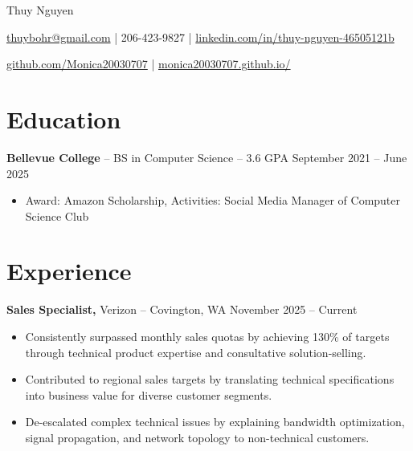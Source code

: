 \documentclass[11pt]{article}       %
\begin{document}
\centerline{\Huge Thuy Nguyen}

\vspace{5pt}

\centerline{\href{mailto:thuybohr@gmail.com}{thuybohr@gmail.com} | 206-423-9827 |
\href{https://www.linkedin.com/in/thuy-nguyen-46505121b/}{linkedin.com/in/thuy-nguyen-46505121b}}

\centerline{\href{https://github.com/Monica20030707}{github.com/Monica20030707} | 
\href{https://monica20030707.github.io/}{monica20030707.github.io/}} 

\vspace{-9pt}

\section*{Education}
\textbf{Bellevue College} -- BS in Computer Science -- 3.6 GPA \hfill September 2021 -- June 2025\\
\vspace{-9pt}
\begin{itemize}
  \item Award: Amazon Scholarship, Activities: Social Media Manager of Computer Science Club
\end{itemize}

\vspace{-18.5pt}

\section*{Experience}

\textbf{Sales Specialist,} {Verizon} -- Covington, WA \hfill November 2025 -- Current \\
\vspace{-9pt}
\begin{itemize}
  \item Consistently surpassed monthly sales quotas by achieving 130\% of targets through technical product expertise and consultative solution-selling.
  \item Contributed to regional sales targets by translating technical specifications into business value for diverse customer segments.
  \item De-escalated complex technical issues by explaining bandwidth optimization, signal propagation, and network topology to non-technical customers.
\end{itemize}
\end{document}
